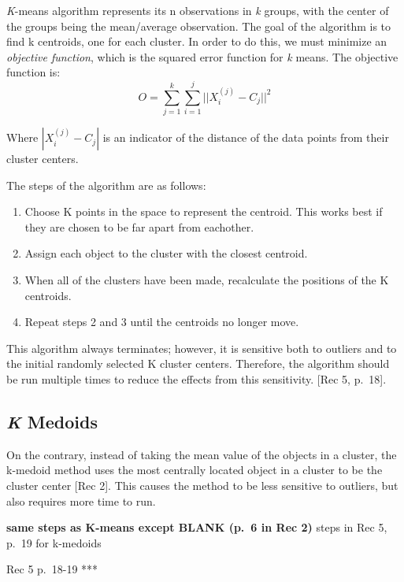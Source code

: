 \documentclass[12pt,twoside]{amherstthesis}
\providecommand{\tightlist}{%
  \setlength{\itemsep}{0pt}\setlength{\parskip}{0pt}}
\begin{document}
  \emph{K}-means algorithm represents its n observations in \emph{k}
  groups, with the center of the groups being the mean/average
  observation. The goal of the algorithm is to find k centroids, one for
  each cluster. In order to do this, we must minimize an \emph{objective
  function}, which is the squared error function for \emph{k} means. The
  objective function is:
  \[O= \sum_{j=1}^k \sum_{i=1}^j ||{{X_i^{(j)}- C_j}}||^2\]
  
  Where \(|{{X_i^{(j)}- C_j}}|\) is an indicator of the distance of the
  data points from their cluster centers.
  
  The steps of the algorithm are as follows:
  
  \begin{enumerate}
  \def\labelenumi{\arabic{enumi}.}
  \tightlist
  \item
    Choose K points in the space to represent the centroid. This works
    best if they are chosen to be far apart from eachother.
  \item
    Assign each object to the cluster with the closest centroid.
  \item
    When all of the clusters have been made, recalculate the positions of
    the K centroids.
  \item
    Repeat steps 2 and 3 until the centroids no longer move.
  \end{enumerate}
  
  This algorithm always terminates; however, it is sensitive both to
  outliers and to the initial randomly selected K cluster centers.
  Therefore, the algorithm should be run multiple times to reduce the
  effects from this sensitivity. {[}Rec 5, p.~18{]}.
  
  \subsection{\texorpdfstring{\emph{K}
  Medoids}{K Medoids}}\label{k-medoids}
  
  On the contrary, instead of taking the mean value of the objects in a
  cluster, the k-medoid method uses the most centrally located object in a
  cluster to be the cluster center {[}Rec 2{]}. This causes the method to
  be less sensitive to outliers, but also requires more time to run.
  
  \textbf{same steps as K-means except BLANK (p.~6 in Rec 2) }steps in Rec
  5, p.~19 for k-medoids
  
  Rec 5 p.~18-19 ***
  
\end{document}
